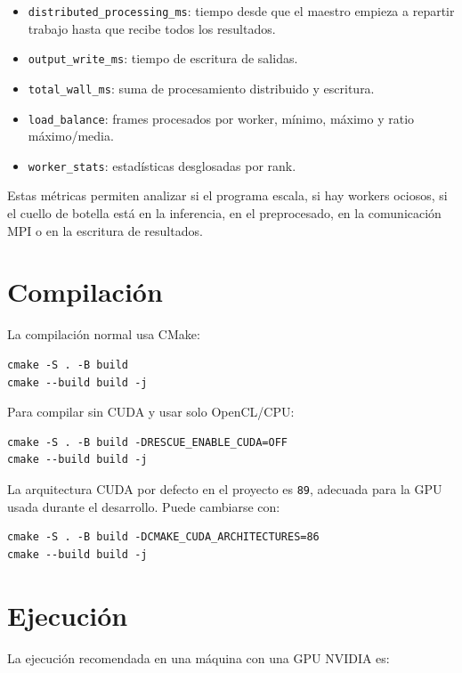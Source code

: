 \documentclass[12pt,a4paper]{article}
\begin{document}
\begin{itemize}
    \item \texttt{distributed\_processing\_ms}: tiempo desde que el maestro empieza a repartir trabajo hasta que recibe todos los resultados.
    \item \texttt{output\_write\_ms}: tiempo de escritura de salidas.
    \item \texttt{total\_wall\_ms}: suma de procesamiento distribuido y escritura.
    \item \texttt{load\_balance}: frames procesados por worker, m\'inimo, m\'aximo y ratio m\'aximo/media.
    \item \texttt{worker\_stats}: estad\'isticas desglosadas por rank.
\end{itemize}

Estas m\'etricas permiten analizar si el programa escala, si hay workers ociosos, si el cuello
de botella est\'a en la inferencia, en el preprocesado, en la comunicaci\'on MPI o en la
escritura de resultados.

\section{Compilaci\'on}

La compilaci\'on normal usa CMake:

\begin{lstlisting}[style=console]
cmake -S . -B build
cmake --build build -j
\end{lstlisting}

Para compilar sin CUDA y usar solo OpenCL/CPU:

\begin{lstlisting}[style=console]
cmake -S . -B build -DRESCUE_ENABLE_CUDA=OFF
cmake --build build -j
\end{lstlisting}

La arquitectura CUDA por defecto en el proyecto es \texttt{89}, adecuada para la GPU usada
durante el desarrollo. Puede cambiarse con:

\begin{lstlisting}[style=console]
cmake -S . -B build -DCMAKE_CUDA_ARCHITECTURES=86
cmake --build build -j
\end{lstlisting}

\section{Ejecuci\'on}

La ejecuci\'on recomendada en una m\'aquina con una GPU NVIDIA es:
\end{document}
